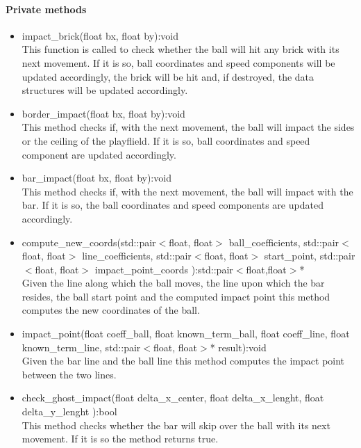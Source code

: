 \documentclass[]{article}
\begin{document}
	\paragraph{Private methods}
	\begin{itemize}
	\item impact\_brick(float bx, float by):void\\ This function is called to check whether the ball will hit any brick with its next movement. If it is so, ball coordinates and speed components will be updated accordingly, the brick will be hit and, if destroyed, the data structures will be updated accordingly.
	\item border\_impact(float bx, float by):void \\This method checks if, with the next movement, the ball will impact the sides or the ceiling of the playflield. If it is so, ball coordinates and speed component are updated accordingly.
	\item bar\_impact(float bx, float by):void \\This method checks if, with the next movement, the ball will impact with the bar. If it is so, the ball coordinates and speed components are updated accordingly.
	\item compute\_new\_coords(std::pair$<$float, float$>$ ball\_coefficients, std::pair$<$float, float$>$ line\_coefficients, std::pair$<$float, float$>$ start\_point, std::pair$<$float, float$>$ impact\_point\_coords ):std::pair$<$float,float$>$*\\Given the line along which the ball moves, the line upon which the bar resides, the ball start point and the computed impact point this method computes the new coordinates of the ball.
	\item impact\_point(float coeff\_ball, float known\_term\_ball, float coeff\_line, float known\_term\_line, std::pair$<$float, float$>$* result):void \\Given the bar line and the ball line this method computes the impact point between the two lines.
	\item check\_ghost\_impact(float delta\_x\_center, float  delta\_x\_lenght, float delta\_y\_lenght ):bool \\This method checks whether the bar will skip over the ball with its next movement. If it is so the method returns true.
	\end{itemize}
\end{document}
